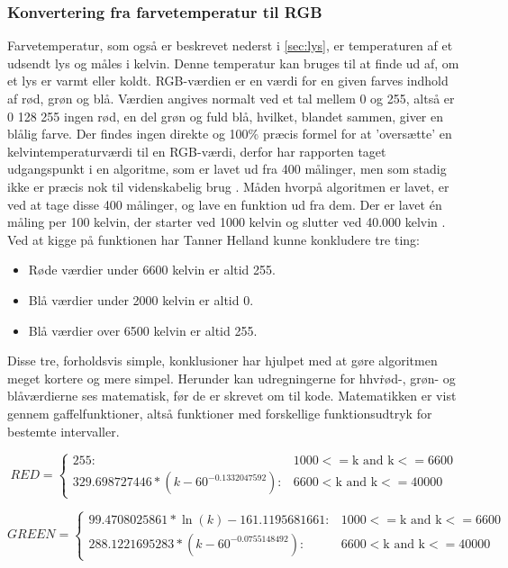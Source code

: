 \subsubsection{Konvertering fra farvetemperatur til RGB}
\label{sec:temptilrgb}
Farvetemperatur, som også er beskrevet nederst i \ref{sec:lys}, er temperaturen af et udsendt lys og måles i kelvin. Denne temperatur kan bruges til at finde ud af, om et lys er varmt eller koldt. 
RGB-værdien er en værdi for en given farves indhold af rød, grøn og blå. Værdien angives normalt ved et tal mellem 0 og 255, altså er 0 128 255 ingen rød, en del grøn og fuld blå, hvilket, blandet sammen, giver en blålig farve.
Der findes ingen direkte og 100\% præcis formel for at ’oversætte’ en kelvintemperaturværdi til en RGB-værdi, derfor har rapporten taget udgangspunkt i en algoritme, som er lavet ud fra 400 målinger, men som stadig ikke er præcis nok til videnskabelig brug \cite{tanner_helland}.
Måden hvorpå algoritmen er lavet, er ved at tage disse 400 målinger, og lave en funktion ud fra dem. Der er lavet én måling per 100 kelvin, der starter ved 1000 kelvin og slutter ved 40.000 kelvin \cite{charity_values}. Ved at kigge på funktionen \cite{tanner_helland_chart} har Tanner Helland kunne konkludere  tre ting:

\begin{itemize}
\item Røde værdier under 6600 kelvin er altid 255.
\item Blå værdier under 2000 kelvin er altid 0.
\item Blå værdier over 6500 kelvin er altid 255.
\end{itemize}

Disse tre, forholdsvis simple, konklusioner har hjulpet med at gøre algoritmen meget kortere og mere simpel. Herunder kan udregningerne for hhv\. rød-, grøn- og blåværdierne ses matematisk, før de er skrevet om til kode. Matematikken er vist gennem gaffelfunktioner, altså funktioner med forskellige funktionsudtryk for bestemte intervaller.


\begin{displaymath}
   RED = \left\{
     \begin{array}{lr}
       255: & 1000 <= \text{k and k} <= 6600\\
       329.698727446*(k-60^{-0.1332047592}): & 6600< \text{k and k} <= 40000
     \end{array}
   \right.
\end{displaymath} 

\begin{displaymath}
   GREEN = \left\{
     \begin{array}{lr}
       99.4708025861*\ln(k)-161.1195681661: & 1000 <= \text{k and k} <= 6600\\
       288.1221695283*(k-60^{-0.0755148492}): & 6600< \text{k and k} <= 40000
     \end{array}
   \right.
\end{displaymath} 

